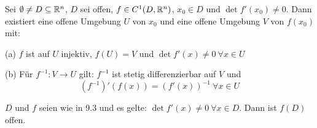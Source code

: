 \documentclass[a4paper,twoside,DIV15,BCOR12mm]{scrbook}
\begin{document}
\begin{satz}
Sei $\emptyset \ne D \subseteq \mathbb{R} ^n$, $D$ sei offen, $f\in C^1(D, \mathbb{R}^n)$, $x_0\in D$ und $\det f'(x_0) \ne 0$. Dann existiert eine offene Umgebung $U$ von $x_0$ und eine offene Umgebung $V$ von $f(x_0)$ mit:
\begin{liste}
\item[(a)] $f$ ist auf $U$ injektiv, $f(U)=V$ und $\det f'(x) \ne 0 \ \forall x\in U$
\item[(b)] Für $f^{-1}: V\to U$ gilt: $f^{-1}$ ist stetig differenzierbar auf $V$ und $$(f^{-1})'(f(x)) = (f'(x))^{-1}\ \forall x\in U$$
\end{liste}

\end{satz}

\begin{folgerung}
$D$ und $f$ seien wie in 9.3 und es gelte: $\det f'(x) \ne 0 \ \forall x\in D$. Dann ist $f(D)$ offen.
\end{folgerung}
\end{document}
